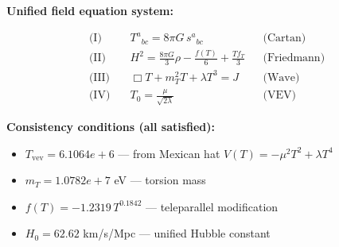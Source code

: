 
\textbf{Unified field equation system:}

\begin{align}
  \text{(I)} \quad & T^a{}_{bc} = 8\pi G \, s^a{}_{bc} && \text{(Cartan)} \\
  \text{(II)} \quad & H^2 = \frac{8\pi G}{3}\rho - \frac{f(T)}{6} + \frac{Tf_T}{3} && \text{(Friedmann)} \\
  \text{(III)} \quad & \Box T + m_T^2 T + \lambda T^3 = J && \text{(Wave)} \\
  \text{(IV)} \quad & T_0 = \frac{\mu}{\sqrt{2\lambda}} && \text{(VEV)}
\end{align}

\textbf{Consistency conditions (all satisfied):}
\begin{itemize}
  \item $T_{\text{vev}} = 6.1064e+6$ — from Mexican hat $V(T) = -\mu^2 T^2 + \lambda T^4$
  \item $m_T = 1.0782e+7$ eV — torsion mass
  \item $f(T) = -1.2319 \, T^{0.1842}$ — teleparallel modification
  \item $H_0 = 62.62$ km/s/Mpc — unified Hubble constant
\end{itemize}